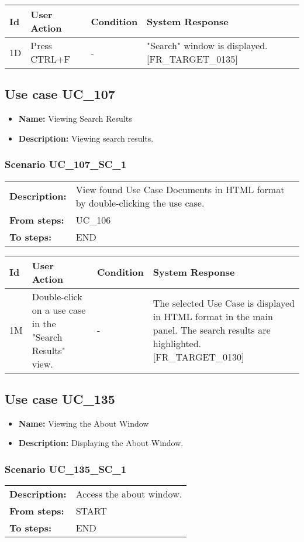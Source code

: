 \documentclass[a4paper,11pt]{article}
\newcommand{\bl}{\\ \hline}
\begin{document}
\begin{tabular}{|p{0.8in}|p{1.6in}|p{1.6in}|p{1.6in}|}
\hline
Id & User Action & Condition & System Response  \bl 
1D & Press CTRL+F & - & "Search" window is displayed. [FR_TARGET_0135] \bl 
\end{tabular}
\subsection*{Use case UC_107}
\begin{itemize}
\item {\bf Name: }Viewing Search Results
\item {\bf Description: }Viewing search results.
\end{itemize}
\subsubsection*{Scenario UC_107_SC_1}
\begin{tabular}{p{1in}p{4in}}
{\bf Description:} & View found Use Case Documents in HTML format by double-clicking the use case. \\
{\bf From steps:} & UC_106#4M \\
{\bf To steps:} & END \\
\end{tabular}
 
\begin{tabular}{|p{0.8in}|p{1.6in}|p{1.6in}|p{1.6in}|}
\hline
Id & User Action & Condition & System Response  \bl 
1M & Double-click on a use case in the "Search Results" view. & - & The selected Use Case is displayed in HTML format in the main panel. The search results are highlighted. [FR_TARGET_0130] \bl 
\end{tabular}
\subsection*{Use case UC_135}
\begin{itemize}
\item {\bf Name: }Viewing the About Window
\item {\bf Description: }Displaying the About Window.
\end{itemize}
\subsubsection*{Scenario UC_135_SC_1}
\begin{tabular}{p{1in}p{4in}}
{\bf Description:} & Access the about window. \\
{\bf From steps:} & START \\
{\bf To steps:} & END \\
\end{tabular}
 
\end{document}
